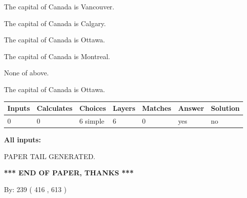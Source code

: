 \documentclass[12pt]{article}
\begin{document}
 
The capital of Canada is Vancouver.
 
 
The capital of Canada is Calgary.
 
 
The capital of Canada is Ottawa.
 
 
The capital of Canada is Montreal.
 
 
 None of above.
 
 
\noindent{}
 
 
The capital of Canada is Ottawa.
 
 
\noindent{}
 
 
   
   
   
   
\noindent\begin{tabular}{|l|l|l|l|l|l|l|}
 \hline
Inputs & Calculates & Choices & Layers & Matches & Answer & Solution \\ \hline
 0  & 
 0  & 
 6
  simple  
  & 
 6  & 
 0  & 
  yes & 
  no 
  \\ \hline
 \end{tabular}
   
   
   
   
\noindent{}
   
   
   
   
\noindent\vspace{0.1in}\hspace{-0.08in} {\textbf{\Large{All inputs: }}}
   
   
   
   
   
   
 \vspace{0.2in}
 
   
   
\vspace{2.0in} PAPER TAIL GENERATED.
   
   
   
   
\vspace{1.0in} 
{\textbf{\large{ *** END OF PAPER, THANKS *** }}} 
   
   
\hspace{1.0in} By: 
 239 ( 416 ,  613 )
   
\end{document}
